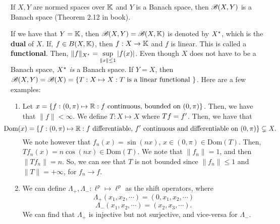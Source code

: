 \begin{theorem}
If $X, Y$ are normed spaces over $\mathbb{K}$ and $Y$ is a Banach space, then $\mathscr{B}(X, Y)$ is a Banach space (Theorem 2.12 in book).
\end{theorem}
If we have that $Y = \mathbb{K}$, then $\mathscr{B}(X, Y) = \mathscr{B}(X, \mathbb{K})$ is denoted by $X^{\star}$, which is the \textbf{dual} of $X$. If, $f \in B(X, \mathbb{K})$, then $f: X \to \mathbb{K}$ and $f$ is linear. This is called a \textbf{functional}. Then, $\| f \|_{X^{\star}} = \sup\limits_{\| x \| \leq 1} |f(x)|$. Even though $X$ does not have to be a Banach space, $X^{\star}$ \textit{is} a Banach space. If $Y = X$, then $\mathscr{B}(X, Y) = \mathscr{B}(X)  = \{ T: X \mapsto X : T \text{ is a linear functional } \}$. Here are a few examples:
\begin{enumerate}
\item Let $x = \{ f: (0, \pi) \mapsto {\mathbb R} : f \text{ continuous, bounded on } (0, \pi) \}$. Then, we have that $\|f \| < \infty$. We define $T: X \mapsto X$ where $Tf = f^{\prime}$. Then, we have that 
\[ \hspace{-10mm} \text{Dom}(x) = \{ f: (0, \pi) \mapsto \R : f \text{ differentiable, } f^{\pr} \text{ continuous and differentiable on } (0, \pi) \} \subsetneq X.\]
We note however that $f_n(x) = \sin(nx)$, $x \in (0, \pi) \in \text{Dom}(T)$. Then, $Tf_n(x) = n\cos(nx) \in \text{Dom}(T)$. We note that $\| f_n \| = 1$, and then $\| Tf_n \| = n$. So, we can see that $T$ is not bounded since $\| f_n \| \leq 1$ and   $\|T \| = + \infty$, for $f_n \to f$. 
\item We can define $\Lambda_+, \Lambda_- : \ell^p \mapsto \ell^p$ as the shift operators, where 
\[ \Lambda_+(x_1, x_2, \cdots) = (0, x_1, x_2, \cdots)\]
\[ \Lambda_-(x_1, x_2, \cdots) = (x_2,  x_3, \cdots).\]
We can find that $\Lambda_+$ is injective but not surjective, and vice-versa for $\Lambda_-$.
\end{enumerate}
